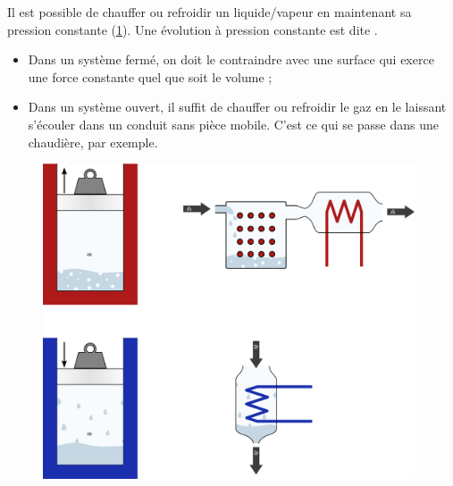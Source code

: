 	Il est possible de chauffer ou refroidir un liquide/vapeur en maintenant sa pression constante (\cref{fig_lv_pression_constante}). Une évolution à pression constante est dite .
		
		\begin{itemize}
			\item Dans un système fermé, on doit le contraindre avec une surface qui exerce une force constante quel que soit le volume ;
			\item Dans un système ouvert, il suffit de chauffer ou refroidir le gaz en le laissant s’écouler dans un conduit sans pièce mobile. C’est ce qui se passe dans une chaudière, par exemple.
		\end{itemize}

		\begin{figure}
			\begin{center}
				\includegraphics[width=11cm]{images/lv_isobare.png}
			\end{center}
			\label{fig_lv_pression_constante}
		\end{figure}
		
